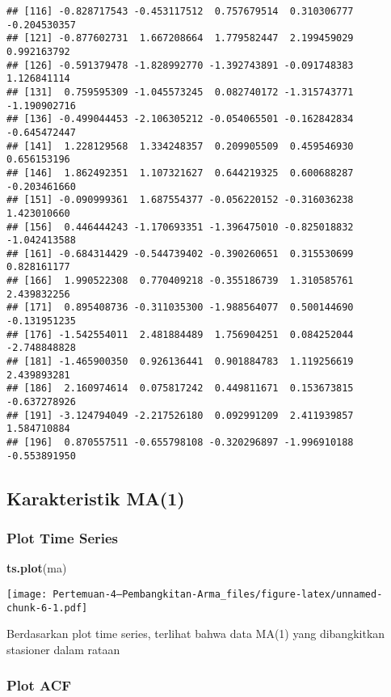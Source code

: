 \documentclass[
]{article}
\newenvironment{Shaded}{\begin{snugshade}}{\end{snugshade}}
\newcommand{\FunctionTok}[1]{\textcolor[rgb]{0.13,0.29,0.53}{\textbf{#1}}}
\newcommand{\NormalTok}[1]{#1}
\begin{document}
\begin{verbatim}
## [116] -0.828717543 -0.453117512  0.757679514  0.310306777 -0.204530357
## [121] -0.877602731  1.667208664  1.779582447  2.199459029  0.992163792
## [126] -0.591379478 -1.828992770 -1.392743891 -0.091748383  1.126841114
## [131]  0.759595309 -1.045573245  0.082740172 -1.315743771 -1.190902716
## [136] -0.499044453 -2.106305212 -0.054065501 -0.162842834 -0.645472447
## [141]  1.228129568  1.334248357  0.209905509  0.459546930  0.656153196
## [146]  1.862492351  1.107321627  0.644219325  0.600688287 -0.203461660
## [151] -0.090999361  1.687554377 -0.056220152 -0.316036238  1.423010660
## [156]  0.446444243 -1.170693351 -1.396475010 -0.825018832 -1.042413588
## [161] -0.684314429 -0.544739402 -0.390260651  0.315530699  0.828161177
## [166]  1.990522308  0.770409218 -0.355186739  1.310585761  2.439832256
## [171]  0.895408736 -0.311035300 -1.988564077  0.500144690 -0.131951235
## [176] -1.542554011  2.481884489  1.756904251  0.084252044 -2.748848828
## [181] -1.465900350  0.926136441  0.901884783  1.119256619  2.439893281
## [186]  2.160974614  0.075817242  0.449811671  0.153673815 -0.637278926
## [191] -3.124794049 -2.217526180  0.092991209  2.411939857  1.584710884
## [196]  0.870557511 -0.655798108 -0.320296897 -1.996910188 -0.553891950
\end{verbatim}

\subsection{Karakteristik MA(1)}\label{karakteristik-ma1}

\subsubsection{Plot Time Series}\label{plot-time-series}

\begin{Shaded}
\begin{Highlighting}[]
\FunctionTok{ts.plot}\NormalTok{(ma)}
\end{Highlighting}
\end{Shaded}

\texttt{[image: Pertemuan-4---Pembangkitan-Arma\_files/figure-latex/unnamed-chunk-6-1.pdf]}

Berdasarkan plot time series, terlihat bahwa data MA(1) yang
dibangkitkan stasioner dalam rataan

\subsubsection{Plot ACF}\label{plot-acf}
\end{document}

